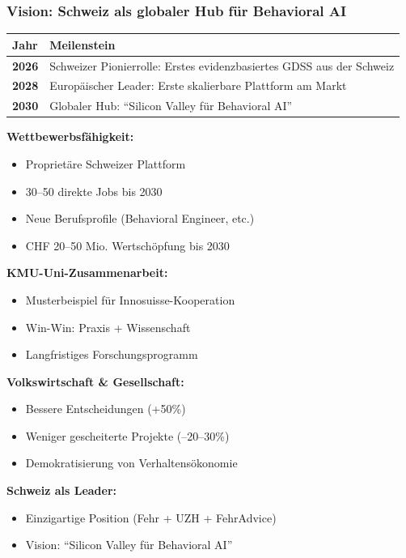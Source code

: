 \documentclass[11pt,a4paper]{article}
\begin{document}
\subsubsection{Vision: Schweiz als globaler Hub für Behavioral AI}

\begin{table}[h]
\centering
\begin{tabular}{ll}
\toprule
\textbf{Jahr} & \textbf{Meilenstein} \\
\midrule
\textbf{2026} & Schweizer Pionierrolle: Erstes evidenzbasiertes GDSS aus der Schweiz \\
\textbf{2028} & Europäischer Leader: Erste skalierbare Plattform am Markt \\
\textbf{2030} & Globaler Hub: ``Silicon Valley für Behavioral AI'' \\
\bottomrule
\end{tabular}
\end{table}

\begin{summarybox}
\textbf{Wettbewerbsfähigkeit:}
\begin{itemize}
    \item Proprietäre Schweizer Plattform
    \item 30--50 direkte Jobs bis 2030
    \item Neue Berufsprofile (Behavioral Engineer, etc.)
    \item CHF 20--50 Mio. Wertschöpfung bis 2030
\end{itemize}

\textbf{KMU-Uni-Zusammenarbeit:}
\begin{itemize}
    \item Musterbeispiel für Innosuisse-Kooperation
    \item Win-Win: Praxis + Wissenschaft
    \item Langfristiges Forschungsprogramm
\end{itemize}

\textbf{Volkswirtschaft \& Gesellschaft:}
\begin{itemize}
    \item Bessere Entscheidungen (+50\%)
    \item Weniger gescheiterte Projekte (--20--30\%)
    \item Demokratisierung von Verhaltensökonomie
\end{itemize}

\textbf{Schweiz als Leader:}
\begin{itemize}
    \item Einzigartige Position (Fehr + UZH + FehrAdvice)
    \item Vision: ``Silicon Valley für Behavioral AI''
\end{itemize}
\end{summarybox}
\end{document}
